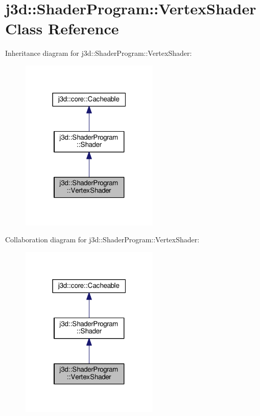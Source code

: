 \hypertarget{classj3d_1_1ShaderProgram_1_1VertexShader}{}\section{j3d\+:\+:Shader\+Program\+:\+:Vertex\+Shader Class Reference}
\label{classj3d_1_1ShaderProgram_1_1VertexShader}


Inheritance diagram for j3d\+:\+:Shader\+Program\+:\+:Vertex\+Shader\+:
\nopagebreak
\begin{figure}[H]
\begin{center}
\leavevmode
\includegraphics[width=187pt]{classj3d_1_1ShaderProgram_1_1VertexShader__inherit__graph}
\end{center}
\end{figure}


Collaboration diagram for j3d\+:\+:Shader\+Program\+:\+:Vertex\+Shader\+:
\nopagebreak
\begin{figure}[H]
\begin{center}
\leavevmode
\includegraphics[width=187pt]{classj3d_1_1ShaderProgram_1_1VertexShader__coll__graph}
\end{center}
\end{figure}
